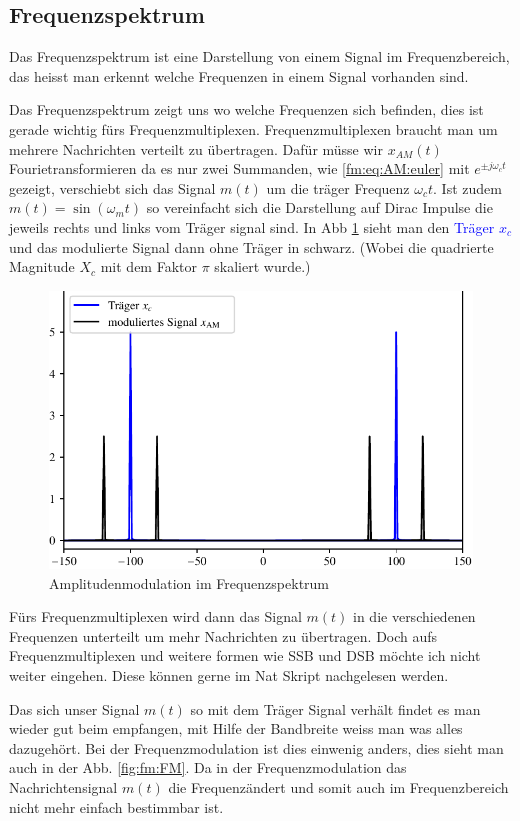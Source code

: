 \subsection{Frequenzspektrum}
Das Frequenzspektrum ist eine Darstellung von einem Signal im Frequenzbereich, das heisst man erkennt welche Frequenzen in einem Signal vorhanden sind.

Das Frequenzspektrum zeigt uns wo welche Frequenzen sich befinden, dies ist gerade wichtig fürs Frequenzmultiplexen.
Frequenzmultiplexen braucht man um mehrere Nachrichten verteilt zu übertragen.
Dafür müsse wir \(x_{AM}(t)\) Fourietransformieren da es nur zwei Summanden, wie \eqref{fm:eq:AM:euler} mit \(e^{\pm j\omega_ct}\)gezeigt, 
verschiebt sich das Signal \(m(t)\) um die träger Frequenz \(\omega_ct\).
Ist zudem \(m(t) = \sin(\omega_m t)\) so vereinfacht sich die Darstellung auf Dirac Impulse die jeweils rechts und links vom Träger signal sind.
In Abb \ref{fig:AM_frequency} sieht man den \textcolor{blue}{Träger $x_c$} und das modulierte Signal dann ohne Träger in schwarz.
(Wobei die quadrierte Magnitude $X_c$ mit dem Faktor $\pi$ skaliert wurde.)
\begin{figure}
	\centering
	\includegraphics{papers/fm/images/amfrequency.pdf}
	\caption{Amplitudenmodulation im Frequenzspektrum}
	\label{fig:AM_frequency}
\end{figure}
Fürs Frequenzmultiplexen wird dann das Signal \(m(t)\) in die verschiedenen Frequenzen unterteilt um mehr Nachrichten zu übertragen.
Doch aufs Frequenzmultiplexen und weitere formen wie SSB und DSB möchte ich nicht weiter eingehen.
Diese können gerne im Nat Skript nachgelesen werden.\cite{fm:NAT}

Das sich unser Signal \(m(t)\)  so mit dem Träger Signal verhält findet es man wieder gut beim empfangen, mit Hilfe der Bandbreite weiss man was alles dazugehört.
Bei der Frequenzmodulation ist dies einwenig anders, dies sieht man auch in der Abb. \ref{fig:fm:FM}.
Da in der Frequenzmodulation das Nachrichtensignal \(m(t)\) die Frequenzändert und somit auch im Frequenzbereich nicht mehr einfach bestimmbar ist.
